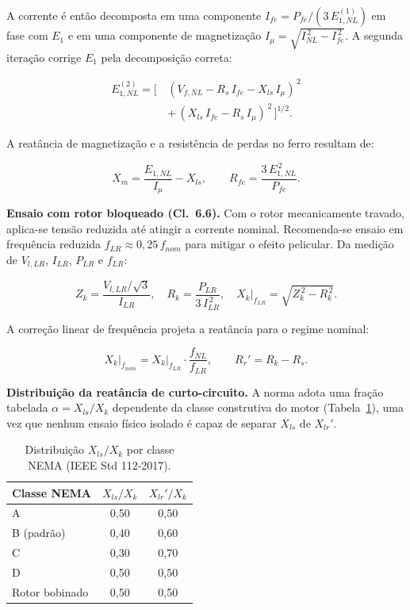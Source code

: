 \documentclass[a4paper]{ifacconf}
\begin{document}
\noindent A corrente é então decomposta em uma componente $I_{fe} = P_{fe}/(3\,E_{1,NL}^{(1)})$ em fase com $E_1$ e em uma componente de magnetização $I_\mu = \sqrt{I_{NL}^{\,2} - I_{fe}^{\,2}}$. A segunda iteração corrige $E_1$ pela decomposição correta:

\begin{equation}
\label{eq:ieee_e1_iter2}
\begin{split}
E_{1,NL}^{(2)} = \big[\,&(V_{f,NL} - R_s\,I_{fe} - X_{ls}\,I_\mu)^{\,2} \\
&+\, (X_{ls}\,I_{fe} - R_s\,I_\mu)^{\,2}\,\big]^{1/2}.
\end{split}
\end{equation}

\noindent A reatância de magnetização e a resistência de perdas no ferro resultam de:

\begin{equation}
\label{eq:ieee_xm_rfe}
X_m = \frac{E_{1,NL}}{I_\mu} - X_{ls}, \qquad R_{fe} = \frac{3\,E_{1,NL}^{\,2}}{P_{fe}}.
\end{equation}

\textbf{Ensaio com rotor bloqueado (Cl.~6.6).} Com o rotor mecanicamente travado, aplica-se tensão reduzida até atingir a corrente nominal. Recomenda-se ensaio em frequência reduzida $f_{LR} \approx 0{,}25\,f_{nom}$ para mitigar o efeito pelicular. Da medição de $V_{l,LR}$, $I_{LR}$, $P_{LR}$ e $f_{LR}$:

\begin{equation}
\label{eq:ieee_zk}
Z_k = \frac{V_{l,LR}/\sqrt{3}}{I_{LR}}, \quad R_k = \frac{P_{LR}}{3\,I_{LR}^{\,2}}, \quad X_k\big|_{f_{LR}} = \sqrt{Z_k^{\,2} - R_k^{\,2}}.
\end{equation}

\noindent A correção linear de frequência projeta a reatância para o regime nominal:

\begin{equation}
\label{eq:ieee_xk_corr}
X_k\big|_{f_{nom}} = X_k\big|_{f_{LR}} \cdot \frac{f_{NL}}{f_{LR}}, \qquad R_r' = R_k - R_s.
\end{equation}

\textbf{Distribuição da reatância de curto-circuito.} A norma adota uma fração tabelada $\alpha = X_{ls}/X_k$ dependente da classe construtiva do motor (Tabela~\ref{tab:nema_split}), uma vez que nenhum ensaio físico isolado é capaz de separar $X_{ls}$ de $X_{lr}'$.

\begin{table}[htbp]
\centering
\caption{Distribuição $X_{ls}/X_k$ por classe NEMA (IEEE Std 112-2017).}
\label{tab:nema_split}
\begin{tabular}{lcc}
\hline
\textbf{Classe NEMA} & $X_{ls}/X_k$ & $X_{lr}'/X_k$ \\ \hline
A & 0,50 & 0,50 \\
B (padrão) & 0,40 & 0,60 \\
C & 0,30 & 0,70 \\
D & 0,50 & 0,50 \\
Rotor bobinado & 0,50 & 0,50 \\ \hline
\end{tabular}
\end{table}
\end{document}

